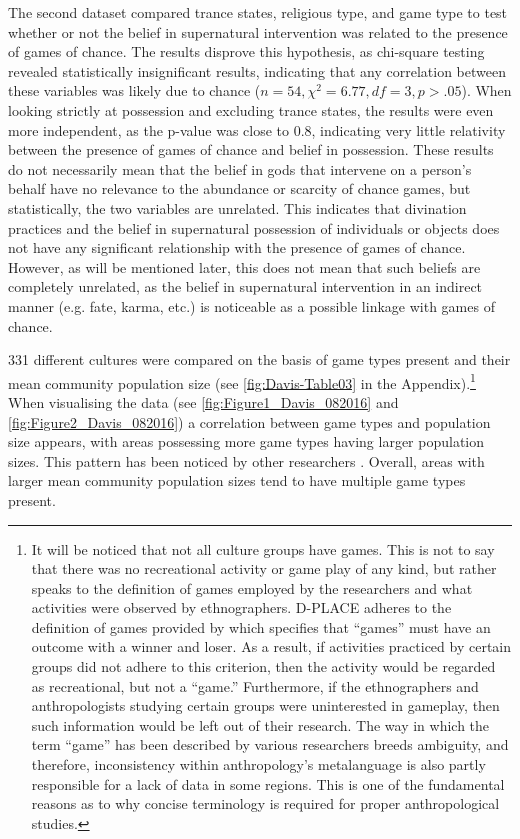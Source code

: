 \documentclass[%
	]{ijsra}
\begin{document}
The second dataset compared trance states, religious type, and game type to test whether or not the belief in supernatural intervention was related to the presence of games of chance. The results disprove this hypothesis, as chi-square testing revealed statistically insignificant results, indicating that any correlation between these variables was likely due to chance ($n = 54, \chi^{2} = 6.77, df = 3, p > .05$).  When looking strictly at possession and excluding trance states, the results were even more independent, as the p-value was close to 0.8, indicating very little relativity between the presence of games of chance and belief in possession. These results do not necessarily mean that the belief in gods that intervene on a person’s behalf have no relevance to the abundance or scarcity of chance games, but statistically, the two variables are unrelated. This indicates that divination practices and the belief in supernatural possession of individuals or objects does not have any significant relationship with the presence of games of chance. However, as will be mentioned later, this does not mean that such beliefs are completely unrelated, as the belief in supernatural intervention in an indirect manner (e.g. fate, karma, etc.) is noticeable as a possible linkage with games of chance.


331 different cultures were compared on the basis of game types present and their mean community population size (see \cref{fig:Davis-Table03} in the Appendix).\footnote{It will be noticed that not all culture groups have games. This is not to say that there was no recreational activity or game play of any kind, but rather speaks to the definition of games employed by the researchers and what activities were observed by ethnographers. D-PLACE adheres to the definition of games provided by \textcite{roberts1959} which specifies that ``games” must have an outcome with a winner and loser. As a result, if activities practiced by certain groups did not adhere to this criterion, then the activity would be regarded as recreational, but not a ``game.” Furthermore, if the ethnographers and anthropologists studying certain groups were uninterested in gameplay, then such information would be left out of their research. The way in which the term ``game” has been described by various researchers breeds ambiguity, and therefore, inconsistency within anthropology’s metalanguage is also partly responsible for a lack of data in some regions. This is one of the fundamental reasons as to why concise terminology is required for proper anthropological studies.} When visualising the data (see \cref{fig:Figure1_Davis_082016} and \cref{fig:Figure2_Davis_082016}) a correlation between game types and population size appears, with areas possessing more game types having larger population sizes. This pattern has been noticed by other researchers \parencites{ball1972}[322]{chick1984}[195]{chick1998}{roberts1959}. Overall, areas with larger mean community population sizes tend to have multiple game types present.
\end{document}
